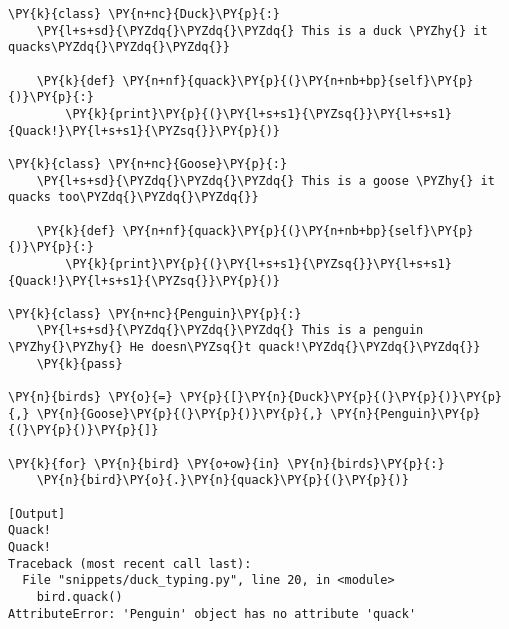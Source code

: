 \begin{Verbatim}[label=\makebox{\url{https://github.com/lucabaldini/cmepda/tree/master/slides/latex/snippets/duck\_typing.py}},commandchars=\\\{\}]
\PY{k}{class} \PY{n+nc}{Duck}\PY{p}{:}
    \PY{l+s+sd}{\PYZdq{}\PYZdq{}\PYZdq{} This is a duck \PYZhy{} it quacks\PYZdq{}\PYZdq{}\PYZdq{}}
    
    \PY{k}{def} \PY{n+nf}{quack}\PY{p}{(}\PY{n+nb+bp}{self}\PY{p}{)}\PY{p}{:}
        \PY{k}{print}\PY{p}{(}\PY{l+s+s1}{\PYZsq{}}\PY{l+s+s1}{Quack!}\PY{l+s+s1}{\PYZsq{}}\PY{p}{)}
        
\PY{k}{class} \PY{n+nc}{Goose}\PY{p}{:}
    \PY{l+s+sd}{\PYZdq{}\PYZdq{}\PYZdq{} This is a goose \PYZhy{} it quacks too\PYZdq{}\PYZdq{}\PYZdq{}}
    
    \PY{k}{def} \PY{n+nf}{quack}\PY{p}{(}\PY{n+nb+bp}{self}\PY{p}{)}\PY{p}{:}
        \PY{k}{print}\PY{p}{(}\PY{l+s+s1}{\PYZsq{}}\PY{l+s+s1}{Quack!}\PY{l+s+s1}{\PYZsq{}}\PY{p}{)}

\PY{k}{class} \PY{n+nc}{Penguin}\PY{p}{:}
    \PY{l+s+sd}{\PYZdq{}\PYZdq{}\PYZdq{} This is a penguin \PYZhy{}\PYZhy{} He doesn\PYZsq{}t quack!\PYZdq{}\PYZdq{}\PYZdq{}}
    \PY{k}{pass} 

\PY{n}{birds} \PY{o}{=} \PY{p}{[}\PY{n}{Duck}\PY{p}{(}\PY{p}{)}\PY{p}{,} \PY{n}{Goose}\PY{p}{(}\PY{p}{)}\PY{p}{,} \PY{n}{Penguin}\PY{p}{(}\PY{p}{)}\PY{p}{]}

\PY{k}{for} \PY{n}{bird} \PY{o+ow}{in} \PY{n}{birds}\PY{p}{:}
    \PY{n}{bird}\PY{o}{.}\PY{n}{quack}\PY{p}{(}\PY{p}{)}

[Output]
Quack!
Quack!
Traceback (most recent call last):
  File "snippets/duck_typing.py", line 20, in <module>
    bird.quack()
AttributeError: 'Penguin' object has no attribute 'quack'
\end{Verbatim}